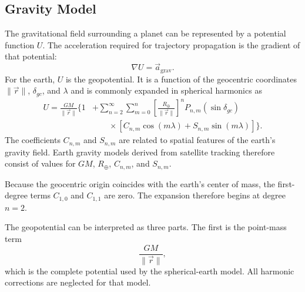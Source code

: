 \subsection{Gravity Model}\label{sec:gravity-model}

The gravitational field surrounding a planet can be represented by a potential
function $U$. The acceleration required for trajectory propagation is the gradient
of that potential:
\begin{equation}
  \nabla U=\vec a_{\mathrm{grav}}.
  \label{eq:gravity-potential-gradient}
\end{equation}
For the earth, $U$ is the geopotential. It is a function of the geocentric coordinates
$\lVert\vec r\rVert$, $\delta_{gc}$, and $\lambda$ and is commonly expanded in
spherical harmonics as
\begin{equation}
  \begin{aligned}
  U=\frac{GM}{\lVert\vec r\rVert}
  \Bigg\{1
  &+\sum_{n=2}^{\infty}\sum_{m=0}^{n}
    \left[\frac{R_{\oplus}}{\lVert\vec r\rVert}\right]^n
    P_{n,m}(\sin\delta_{gc})\\[-0.2em]
  &\qquad\times
    \left[C_{n,m}\cos(m\lambda)+S_{n,m}\sin(m\lambda)\right]
  \Bigg\}.
  \end{aligned}
  \label{eq:geopotential-spherical-harmonics}
\end{equation}
The coefficients $C_{n,m}$ and $S_{n,m}$ are related to spatial features of the
earth's gravity field. Earth gravity models derived from satellite tracking therefore
consist of values for $GM$, $R_{\oplus}$, $C_{n,m}$, and $S_{n,m}$.

Because the geocentric origin coincides with the earth's center of mass, the
first-degree terms $C_{1,0}$ and $C_{1,1}$ are zero. The expansion therefore begins
at degree $n=2$.


The geopotential can be interpreted as three parts. The first is the point-mass term
\begin{equation}
  \frac{GM}{\lVert\vec r\rVert},
  \label{eq:point-mass-geopotential}
\end{equation}
which is the complete potential used by the spherical-earth model. All harmonic
corrections are neglected for that model.

